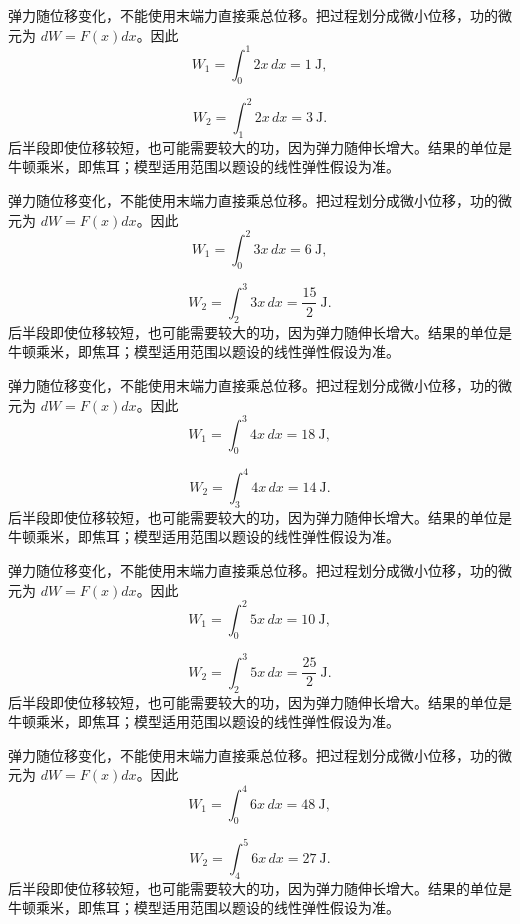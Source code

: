 \documentclass[UTF8,12pt,a4paper,fontset=fandol]{ctexart}
\begin{document}
\begin{solve}\label{ans:c21q19}
弹力随位移变化，不能使用末端力直接乘总位移。把过程划分成微小位移，功的微元为 $dW=F(x)dx$。因此
\[
W_1=\int_0^{1}2x\,dx=1\ \mathrm{J},
\]

\[
W_2=\int_{1}^{2}2x\,dx=3\ \mathrm{J}.
\]
后半段即使位移较短，也可能需要较大的功，因为弹力随伸长增大。结果的单位是牛顿乘米，即焦耳；模型适用范围以题设的线性弹性假设为准。
\end{solve}

\begin{solve}\label{ans:c21q20}
弹力随位移变化，不能使用末端力直接乘总位移。把过程划分成微小位移，功的微元为 $dW=F(x)dx$。因此
\[
W_1=\int_0^{2}3x\,dx=6\ \mathrm{J},
\]

\[
W_2=\int_{2}^{3}3x\,dx=\frac{15}{2}\ \mathrm{J}.
\]
后半段即使位移较短，也可能需要较大的功，因为弹力随伸长增大。结果的单位是牛顿乘米，即焦耳；模型适用范围以题设的线性弹性假设为准。
\end{solve}

\begin{solve}\label{ans:c21q21}
弹力随位移变化，不能使用末端力直接乘总位移。把过程划分成微小位移，功的微元为 $dW=F(x)dx$。因此
\[
W_1=\int_0^{3}4x\,dx=18\ \mathrm{J},
\]

\[
W_2=\int_{3}^{4}4x\,dx=14\ \mathrm{J}.
\]
后半段即使位移较短，也可能需要较大的功，因为弹力随伸长增大。结果的单位是牛顿乘米，即焦耳；模型适用范围以题设的线性弹性假设为准。
\end{solve}

\begin{solve}\label{ans:c21q22}
弹力随位移变化，不能使用末端力直接乘总位移。把过程划分成微小位移，功的微元为 $dW=F(x)dx$。因此
\[
W_1=\int_0^{2}5x\,dx=10\ \mathrm{J},
\]

\[
W_2=\int_{2}^{3}5x\,dx=\frac{25}{2}\ \mathrm{J}.
\]
后半段即使位移较短，也可能需要较大的功，因为弹力随伸长增大。结果的单位是牛顿乘米，即焦耳；模型适用范围以题设的线性弹性假设为准。
\end{solve}

\begin{solve}\label{ans:c21q23}
弹力随位移变化，不能使用末端力直接乘总位移。把过程划分成微小位移，功的微元为 $dW=F(x)dx$。因此
\[
W_1=\int_0^{4}6x\,dx=48\ \mathrm{J},
\]

\[
W_2=\int_{4}^{5}6x\,dx=27\ \mathrm{J}.
\]
后半段即使位移较短，也可能需要较大的功，因为弹力随伸长增大。结果的单位是牛顿乘米，即焦耳；模型适用范围以题设的线性弹性假设为准。
\end{solve}
\end{document}
